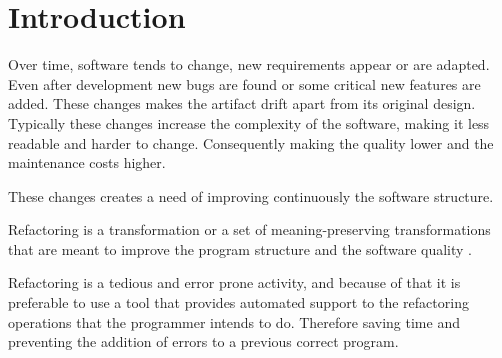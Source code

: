 
% 
% 

\section{Introduction}


Over time, software tends to change, new requirements appear or are adapted. 
Even after development new bugs are found or some critical new features are added.
These changes makes the artifact drift apart from its original design.
Typically these changes increase the complexity of the software, making it less readable and harder to change. 
Consequently making the quality lower and the maintenance costs higher. %

These changes creates a need of improving continuously the software structure.

Refactoring is a transformation or a set of meaning-preserving transformations that are meant to improve the program structure and the software quality \cite{bourquin2007high}.



Refactoring is a tedious and error prone activity, and because of that it is preferable to use a tool that provides automated support to the refactoring operations that the programmer intends to do. 
Therefore saving time and preventing the addition of errors to a previous correct program.

